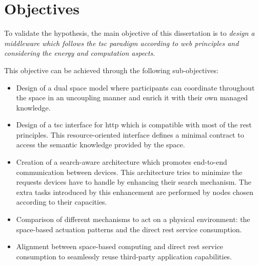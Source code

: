 \section{Objectives}

To validate the hypothesis, the main objective of this dissertation is to
\emph{design a middleware which follows the \ac{tsc} paradigm according to web principles and considering the energy and computation aspects}.

This objective can be achieved through the following sub-objectives:

\begin{itemize} %
  \item Design of a dual space model where participants can coordinate throughout the space in an uncoupling manner and enrich it with their own managed knowledge.
  \item Design of a \ac{tsc} interface for \ac{http} which is compatible with most of the \ac{rest} principles.
	This resource-oriented interface defines a minimal contract to access the semantic knowledge provided by the space. %
  \item Creation of a search-aware architecture which promotes end-to-end communication between devices. %
	This architecture tries to minimize the requests devices have to handle by enhancing their search mechanism.
	The extra tasks introduced by this enhancement are performed by nodes chosen according to their capacities.
  \item Comparison of different mechanisms to act on a physical environment: the space-based actuation patterns and the direct \ac{rest} service consumption.
  \item Alignment between space-based computing and direct \ac{rest} service consumption to seamlessly reuse third-party application capabilities.
\end{itemize}